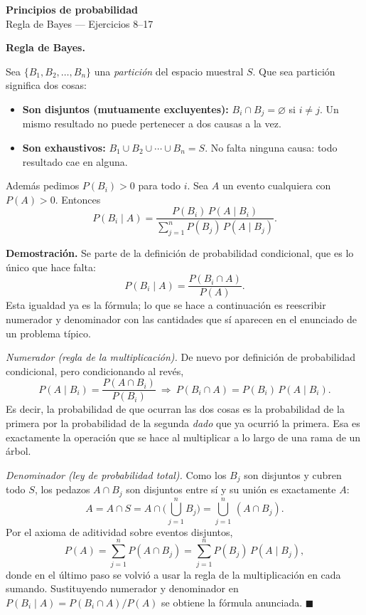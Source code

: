 \documentclass[11pt]{article}
\begin{document}
\begin{center}{\LARGE\bfseries Principios de probabilidad}\\[2pt]{\large Regla de Bayes --- Ejercicios 8--17}\end{center}

\vspace{4pt}

\begin{teo}
\textbf{Regla de Bayes.}

Sea $\{B_1,B_2,\dots,B_n\}$ una \emph{partición} del espacio muestral $S$. Que sea partición significa dos cosas:
\begin{itemize}[nosep,leftmargin=*]
  \item \textbf{Son disjuntos (mutuamente excluyentes):} $B_i\cap B_j=\varnothing$ si $i\neq j$. Un mismo resultado no puede pertenecer a dos causas a la vez.
  \item \textbf{Son exhaustivos:} $B_1\cup B_2\cup\cdots\cup B_n=S$. No falta ninguna causa: todo resultado cae en alguna.
\end{itemize}
Además pedimos $P(B_i)>0$ para todo $i$. Sea $A$ un evento cualquiera con $P(A)>0$. Entonces
\[
P(B_i\mid A)=\frac{P(B_i)\,P(A\mid B_i)}{\displaystyle\sum_{j=1}^{n}P(B_j)\,P(A\mid B_j)}.
\]

\medskip
\textbf{Demostración.} Se parte de la definición de probabilidad condicional, que es lo único que hace falta:
\[
P(B_i\mid A)=\frac{P(B_i\cap A)}{P(A)}.
\]
Esta igualdad ya es la fórmula; lo que se hace a continuación es reescribir numerador y denominador con las cantidades que sí aparecen en el enunciado de un problema típico.

\emph{Numerador (regla de la multiplicación).} De nuevo por definición de probabilidad condicional, pero condicionando al revés,
\[
P(A\mid B_i)=\frac{P(A\cap B_i)}{P(B_i)}\ \Longrightarrow\ P(B_i\cap A)=P(B_i)\,P(A\mid B_i).
\]
Es decir, la probabilidad de que ocurran las dos cosas es la probabilidad de la primera por la probabilidad de la segunda \emph{dado} que ya ocurrió la primera. Esa es exactamente la operación que se hace al multiplicar a lo largo de una rama de un árbol.

\emph{Denominador (ley de probabilidad total).} Como los $B_j$ son disjuntos y cubren todo $S$, los pedazos $A\cap B_j$ son disjuntos entre sí y su unión es exactamente $A$:
\[
A=A\cap S=A\cap\Big(\bigcup_{j=1}^{n}B_j\Big)=\bigcup_{j=1}^{n}\,(A\cap B_j).
\]
Por el axioma de aditividad sobre eventos disjuntos,
\[
P(A)=\sum_{j=1}^{n}P(A\cap B_j)=\sum_{j=1}^{n}P(B_j)\,P(A\mid B_j),
\]
donde en el último paso se volvió a usar la regla de la multiplicación en cada sumando. Sustituyendo numerador y denominador en $P(B_i\mid A)=P(B_i\cap A)/P(A)$ se obtiene la fórmula anunciada. $\blacksquare$


\end{teo}
\end{document}

